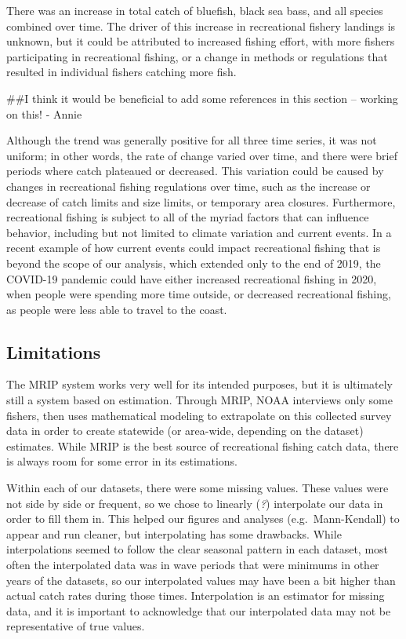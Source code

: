 \documentclass[
  12pt,
]{article}
\begin{document}
There was an increase in total catch of bluefish, black sea bass, and
all species combined over time. The driver of this increase in
recreational fishery landings is unknown, but it could be attributed to
increased fishing effort, with more fishers participating in
recreational fishing, or a change in methods or regulations that
resulted in individual fishers catching more fish.

\#\#I think it would be beneficial to add some references in this
section -- working on this! - Annie

Although the trend was generally positive for all three time series, it
was not uniform; in other words, the rate of change varied over time,
and there were brief periods where catch plateaued or decreased. This
variation could be caused by changes in recreational fishing regulations
over time, such as the increase or decrease of catch limits and size
limits, or temporary area closures. Furthermore, recreational fishing is
subject to all of the myriad factors that can influence behavior,
including but not limited to climate variation and current events. In a
recent example of how current events could impact recreational fishing
that is beyond the scope of our analysis, which extended only to the end
of 2019, the COVID-19 pandemic could have either increased recreational
fishing in 2020, when people were spending more time outside, or
decreased recreational fishing, as people were less able to travel to
the coast.

\hypertarget{limitations}{%
\subsection{Limitations}\label{limitations}}

The MRIP system works very well for its intended purposes, but it is
ultimately still a system based on estimation. Through MRIP, NOAA
interviews only some fishers, then uses mathematical modeling to
extrapolate on this collected survey data in order to create statewide
(or area-wide, depending on the dataset) estimates. While MRIP is the
best source of recreational fishing catch data, there is always room for
some error in its estimations.

Within each of our datasets, there were some missing values. These
values were not side by side or frequent, so we chose to linearly
(\emph{?}) interpolate our data in order to fill them in. This helped
our figures and analyses (e.g.~Mann-Kendall) to appear and run cleaner,
but interpolating has some drawbacks. While interpolations seemed to
follow the clear seasonal pattern in each dataset, most often the
interpolated data was in wave periods that were minimums in other years
of the datasets, so our interpolated values may have been a bit higher
than actual catch rates during those times. Interpolation is an
estimator for missing data, and it is important to acknowledge that our
interpolated data may not be representative of true values.
\end{document}

